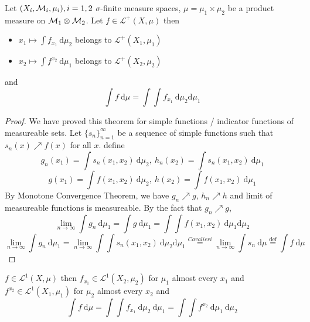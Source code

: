 \begin{theorem}
  Let $(X_i, \mathcal M_i, \mu_i), i=1,2$ $\sigma$-finite measure spaces, $\mu = \mu_1 \times \mu_2$ be a product measure on $\mathcal M_1 \otimes \mathcal M_2$. 
  Let $f \in \mathcal{L}^+(X, \mu)$ then 
  \begin{itemize}
    \item $x_1 \mapsto \int f_{x_1} \ \mathrm{d}\mu_2$ belongs to $\mathcal{L}^+(X_1, \mu_1)$
    \item $x_2 \mapsto \int f^{x_2} \ \mathrm{d}\mu_1$ belongs to $\mathcal{L}^+(X_2, \mu_2)$
  \end{itemize}
  and 
  \[\int f \ \mathrm{d}\mu = \int \int f_{x_1} \ \mathrm{d}\mu_2 \mathrm{d}\mu_1\]
\end{theorem}

\begin{proof}
  We have proved this theorem for simple functions / indicator functions of measureable sets.
  Let $\{s_n\}_{n=1}^\infty$ be a sequence of simple functions such that $s_n(x) \nearrow f(x)$ for all $x$. 
  define 
  \[g_n(x_1) = \int s_n(x_1, x_2) \ \mathrm{d}\mu_2,\ h_n(x_2) = \int s_n(x_1, x_2) \ \mathrm{d}\mu_1\]
  \[g(x_1) = \int f(x_1, x_2) \ \mathrm{d}\mu_2,\ h(x_2) = \int f(x_1, x_2) \ \mathrm{d}\mu_1\]
  By Monotone Convergence Theorem, we have $g_n \nearrow g$, $h_n \nearrow h$ and limit of measureable functions is measureable.
  By the fact that $g_n \nearrow g$, 
  \[\lim_{n\to\infty}\int g_n \ \mathrm{d}\mu_1 = \int g \ \mathrm{d}\mu_1 = \int \int f(x_1, x_2) \ \mathrm{d}\mu_1 \mathrm{d}\mu_2 \]
  \[\lim_{n\to\infty}\int g_n \ \mathrm{d}\mu_1 = \lim_{n\to\infty} \int\int s_n(x_1, x_2) \ \mathrm{d}\mu_2 \mathrm{d}\mu_1 \overset{Cavalieri}= \lim_{n\to\infty} \int s_n \ \mathrm{d}\mu \overset{\text{def}}= \int f \ \mathrm{d}\mu\]
\end{proof}

\begin{theorem}
  $f \in \mathcal{L}^1(X, \mu)$ then $f_{x_1} \in \mathcal{L}^1(X_2, \mu_2)$ for $\mu_1$ almost every $x_1$ and $f^{x_2} \in \mathcal{L}^1(X_1, \mu_1)$ for $\mu_2$ almost every $x_2$
  and 
  \[\int f \ \mathrm{d}\mu = \int \int f_{x_1} \ \mathrm{d}\mu_2 \ \mathrm{d}\mu_1 = \int \int f^{x_2} \ \mathrm{d}\mu_1 \ \mathrm{d}\mu_2\]
\end{theorem}
